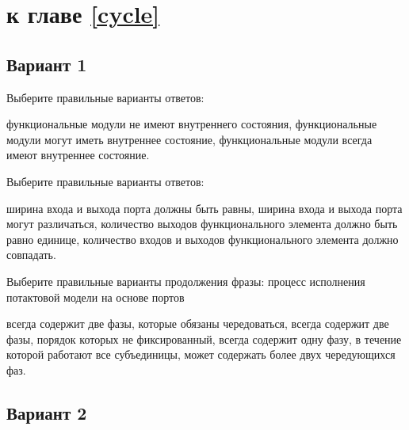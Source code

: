 
\section{\Questions к главе \ref{cycle}} %

\subsection*{Вариант 1}

\begin{questions}

\question[3] Выберите правильные варианты ответов:
\begin{choices}
    \correctchoice функциональные модули не имеют внутреннего состояния,
    \choice функциональные модули могут иметь внутреннее состояние,
    \choice функциональные модули всегда имеют внутреннее состояние.
\end{choices}
    
    
\question[3] Выберите правильные варианты ответов:
\begin{choices}
    \correctchoice ширина входа и выхода порта должны быть равны,
    \choice ширина входа и выхода порта могут различаться,
    \choice количество выходов функционального элемента должно быть равно единице,
    \choice количество входов и выходов функционального элемента должно совпадать.
\end{choices}
    
\question[3] Выберите правильные варианты продолжения фразы: процесс исполнения потактовой модели на основе портов 
\begin{choices}
    \correctchoice всегда содержит две фазы, которые обязаны чередоваться,
    \choice всегда содержит две фазы, порядок которых не фиксированный,
    \choice всегда содержит одну фазу, в течение которой работают все субъединицы,
    \choice может содержать более двух чередующихся фаз.
\end{choices}



\end{questions}

\subsection*{Вариант 2}

